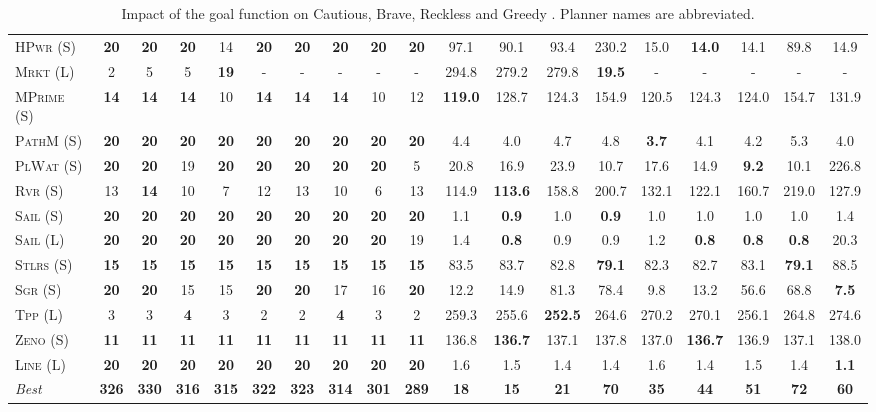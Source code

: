 \documentclass[11pt,landscape]{article}
\begin{document}
\begin{table}[tb]
{\begin{tabular}{|l||ccccccccc||ccccccccc||}
\textsc{HPwr} (S)&\textbf{20}&\textbf{20}&\textbf{20}&14&\textbf{20}&\textbf{20}&\textbf{20}&\textbf{20}&\textbf{20}&97.1&90.1&93.4&230.2&15.0&\textbf{14.0}&14.1&89.8&14.9\\
\textsc{Mrkt} (L)&2&5&5&\textbf{19}&-&-&-&-&-&294.8&279.2&279.8&\textbf{19.5}&-&-&-&-&-\\
\textsc{MPrime} (S)&\textbf{14}&\textbf{14}&\textbf{14}&10&\textbf{14}&\textbf{14}&\textbf{14}&10&12&\textbf{119.0}&128.7&124.3&154.9&120.5&124.3&124.0&154.7&131.9\\
\textsc{PathM} (S)&\textbf{20}&\textbf{20}&\textbf{20}&\textbf{20}&\textbf{20}&\textbf{20}&\textbf{20}&\textbf{20}&\textbf{20}&4.4&4.0&4.7&4.8&\textbf{3.7}&4.1&4.2&5.3&4.0\\
\textsc{PlWat} (S)&\textbf{20}&\textbf{20}&19&\textbf{20}&\textbf{20}&\textbf{20}&\textbf{20}&\textbf{20}&5&20.8&16.9&23.9&10.7&17.6&14.9&\textbf{9.2}&10.1&226.8\\
\textsc{Rvr} (S)&13&\textbf{14}&10&7&12&13&10&6&13&114.9&\textbf{113.6}&158.8&200.7&132.1&122.1&160.7&219.0&127.9\\
\textsc{Sail} (S)&\textbf{20}&\textbf{20}&\textbf{20}&\textbf{20}&\textbf{20}&\textbf{20}&\textbf{20}&\textbf{20}&\textbf{20}&1.1&\textbf{0.9}&1.0&\textbf{0.9}&1.0&1.0&1.0&1.0&1.4\\
\textsc{Sail} (L)&\textbf{20}&\textbf{20}&\textbf{20}&\textbf{20}&\textbf{20}&\textbf{20}&\textbf{20}&\textbf{20}&19&1.4&\textbf{0.8}&0.9&0.9&1.2&\textbf{0.8}&\textbf{0.8}&\textbf{0.8}&20.3\\
\textsc{Stlrs} (S)&\textbf{15}&\textbf{15}&\textbf{15}&\textbf{15}&\textbf{15}&\textbf{15}&\textbf{15}&\textbf{15}&\textbf{15}&83.5&83.7&82.8&\textbf{79.1}&82.3&82.7&83.1&\textbf{79.1}&88.5\\
\textsc{Sgr} (S)&\textbf{20}&\textbf{20}&15&15&\textbf{20}&\textbf{20}&17&16&\textbf{20}&12.2&14.9&81.3&78.4&9.8&13.2&56.6&68.8&\textbf{7.5}\\
\textsc{Tpp} (L)&3&3&\textbf{4}&3&2&2&\textbf{4}&3&2&259.3&255.6&\textbf{252.5}&264.6&270.2&270.1&256.1&264.8&274.6\\
\textsc{Zeno} (S)&\textbf{11}&\textbf{11}&\textbf{11}&\textbf{11}&\textbf{11}&\textbf{11}&\textbf{11}&\textbf{11}&\textbf{11}&136.8&\textbf{136.7}&137.1&137.8&137.0&\textbf{136.7}&136.9&137.1&138.0\\
\textsc{Line} (L)&\textbf{20}&\textbf{20}&\textbf{20}&\textbf{20}&\textbf{20}&\textbf{20}&\textbf{20}&\textbf{20}&\textbf{20}&1.6&1.5&1.4&1.4&1.6&1.4&1.5&1.4&\textbf{1.1}
\\\hline
\textit{Best}&\textbf{326}&\textbf{330}&\textbf{316}&\textbf{315}&\textbf{322}&\textbf{323}&\textbf{314}&\textbf{301}&\textbf{289}&\textbf{18}&\textbf{15}&\textbf{21}&\textbf{70}&\textbf{35}&\textbf{44}&\textbf{51}&\textbf{72}&\textbf{60}\\\hline

        \end{tabular}}
        \caption{Impact of the goal function on Cautious, Brave, Reckless and Greedy \pattyd. Planner names are abbreviated.}
        \label{tab:abl-gf}
        \end{table}
        
\end{document}
